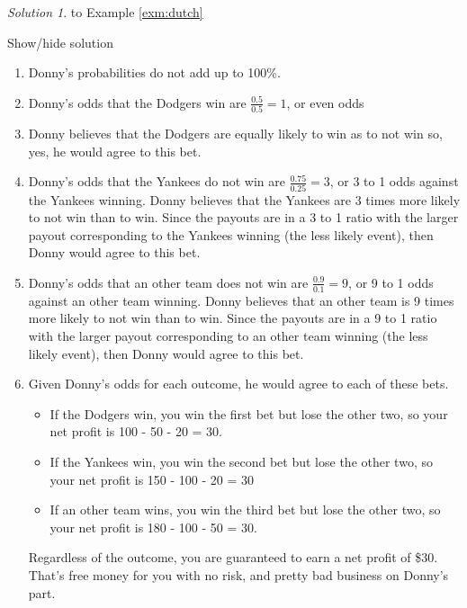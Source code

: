 \documentclass[
]{book}
\providecommand{\tightlist}{%
  \setlength{\itemsep}{0pt}\setlength{\parskip}{0pt}}
\theoremstyle{definition}
\theoremstyle{definition}
\theoremstyle{definition}
\theoremstyle{remark}
\newtheorem*{solution}{Solution}
\begin{document}
\begin{solution}
{}
to Example \ref{exm:dutch}
\end{solution}

Show/hide solution

\begin{enumerate}
\def\labelenumi{\arabic{enumi}.}
\item
  Donny's probabilities do not add up to 100\%.
\item
  Donny's odds that the Dodgers win are \(\frac{0.5}{0.5}=1\), or even odds
\item
  Donny believes that the Dodgers are equally likely to win as to not win so, yes, he would agree to this bet.
\item
  Donny's odds that the Yankees do not win are \(\frac{0.75}{0.25}=3\), or 3 to 1 odds against the Yankees winning. Donny believes that the Yankees are 3 times more likely to not win than to win. Since the payouts are in a 3 to 1 ratio with the larger payout corresponding to the Yankees winning (the less likely event), then Donny would agree to this bet.
\item
  Donny's odds that an other team does not win are \(\frac{0.9}{0.1}=9\), or 9 to 1 odds against an other team winning. Donny believes that an other team is 9 times more likely to not win than to win. Since the payouts are in a 9 to 1 ratio with the larger payout corresponding to an other team winning (the less likely event), then Donny would agree to this bet.
\item
  Given Donny's odds for each outcome, he would agree to each of these bets.

  \begin{itemize}
  \tightlist
  \item
    If the Dodgers win, you win the first bet but lose the other two, so your net profit is 100 - 50 - 20 = 30.
  \item
    If the Yankees win, you win the second bet but lose the other two, so your net profit is 150 - 100 - 20 = 30
  \item
    If an other team wins, you win the third bet but lose the other two, so your net profit is 180 - 100 - 50 = 30.
  \end{itemize}

  Regardless of the outcome, you are guaranteed to earn a net profit of \$30. That's free money for you with no risk, and pretty bad business on Donny's part.
\end{enumerate}
\end{document}

